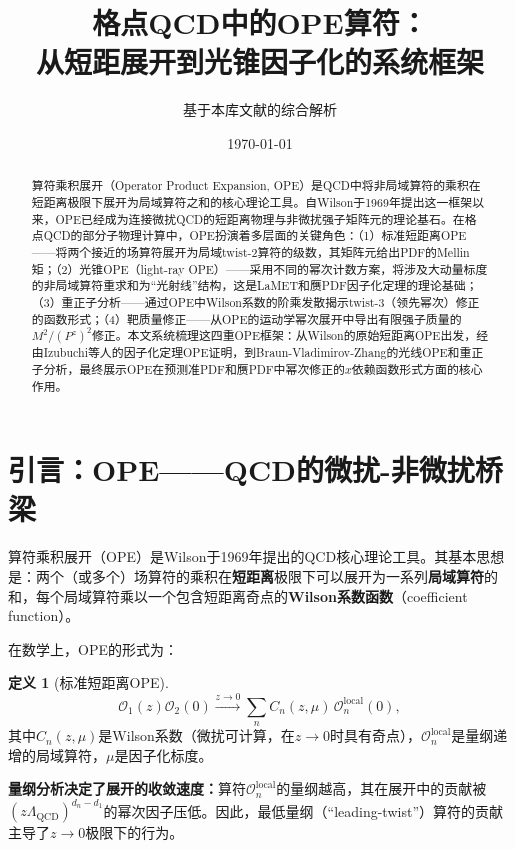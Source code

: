 \documentclass[12pt,a4paper]{ctexart}
\title{\heiti 格点QCD中的OPE算符：\\
从短距展开到光锥因子化的系统框架}
\author{基于本库文献的综合解析}
\date{\today}
\theoremstyle{definition}
\newtheorem{definition}{定义}[section]
\begin{document}
\maketitle

\begin{abstract}
\noindent
算符乘积展开（Operator Product Expansion, OPE）是QCD中将非局域算符的乘积在短距离极限下展开为局域算符之和的核心理论工具。自Wilson于1969年提出这一框架以来，OPE已经成为连接微扰QCD的短距离物理与非微扰强子矩阵元的理论基石。在格点QCD的部分子物理计算中，OPE扮演着多层面的关键角色：（1）标准短距离OPE——将两个接近的场算符展开为局域twist-2算符的级数，其矩阵元给出PDF的Mellin矩；（2）光锥OPE（light-ray OPE）——采用不同的幂次计数方案，将涉及大动量标度的非局域算符重求和为``光射线''结构，这是LaMET和赝PDF因子化定理的理论基础；（3）重正子分析——通过OPE中Wilson系数的阶乘发散揭示twist-3（领先幂次）修正的函数形式；（4）靶质量修正——从OPE的运动学幂次展开中导出有限强子质量的$M^2/(P^z)^2$修正。本文系统梳理这四重OPE框架：从Wilson的原始短距离OPE出发，经由Izubuchi等人的因子化定理OPE证明，到Braun-Vladimirov-Zhang的光线OPE和重正子分析，最终展示OPE在预测准PDF和赝PDF中幂次修正的$x$依赖函数形式方面的核心作用。
\end{abstract}

\tableofcontents
\newpage

\section{引言：OPE——QCD的微扰-非微扰桥梁}

算符乘积展开（OPE）是Wilson于1969年提出的QCD核心理论工具。其基本思想是：两个（或多个）场算符的乘积在\textbf{短距离}极限下可以展开为一系列\textbf{局域算符}的和，每个局域算符乘以一个包含短距离奇点的\textbf{Wilson系数函数}（coefficient function）\cite{JaffeManohar1990,Izubuchi2018,Braun2019power}。

在数学上，OPE的形式为\cite{Izubuchi2018}：

\begin{definition}[标准短距离OPE]
\begin{equation}
\boxed{\mathcal{O}_1(z) \mathcal{O}_2(0) \xrightarrow{z \to 0} \sum_n C_n(z, \mu) \, \mathcal{O}_n^{\text{local}}(0)},
\label{eq:standard_OPE}
\end{equation}
其中$C_n(z, \mu)$是Wilson系数（微扰可计算，在$z \to 0$时具有奇点），$\mathcal{O}_n^{\text{local}}$是量纲递增的局域算符，$\mu$是因子化标度。
\end{definition}

\textbf{量纲分析决定了展开的收敛速度：}算符$\mathcal{O}_n^{\text{local}}$的量纲越高，其在展开中的贡献被$(z\Lambda_{\text{QCD}})^{d_n-d_1}$的幂次因子压低。因此，最低量纲（``leading-twist''）算符的贡献主导了$z \to 0$极限下的行为。
\end{document}
